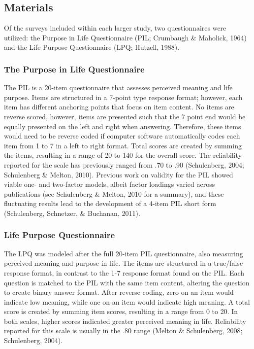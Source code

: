 \documentclass[english,man, mask]{apa6}
\theoremstyle{definition}
\theoremstyle{definition}
\theoremstyle{definition}
\theoremstyle{remark}
\begin{document}
\subsection{Materials}\label{materials}

Of the surveys included within each larger study, two questionnaires
were utilized: the Purpose in Life Questionnaire (PIL; Crumbaugh \&
Maholick, 1964) and the Life Purpose Questionnaire (LPQ; Hutzell, 1988).

\subsubsection{The Purpose in Life
Questionnaire}\label{the-purpose-in-life-questionnaire}

The PIL is a 20-item questionnaire that assesses perceived meaning and
life purpose. Items are structured in a 7-point type response format;
however, each item has different anchoring points that focus on item
content. No items are reverse scored, however, items are presented such
that the 7 point end would be equally presented on the left and right
when answering. Therefore, these items would need to be reverse coded if
computer software automatically codes each item from 1 to 7 in a left to
right format. Total scores are created by summing the items, resulting
in a range of 20 to 140 for the overall score. The reliability reported
for the scale has previously ranged from .70 to .90 (Schulenberg, 2004;
Schulenberg \& Melton, 2010). Previous work on validity for the PIL
showed viable one- and two-factor models, albeit factor loadings varied
across publications (see Schulenberg \& Melton, 2010 for a summary), and
these fluctuating results lead to the development of a 4-item PIL short
form (Schulenberg, Schnetzer, \& Buchanan, 2011).

\subsubsection{Life Purpose
Questionnaire}\label{life-purpose-questionnaire}

The LPQ was modeled after the full 20-item PIL questionnaire, also
measuring perceived meaning and purpose in life. The items are
structured in a true/false response format, in contrast to the 1-7
response format found on the PIL. Each question is matched to the PIL
with the same item content, altering the question to create binary
answer format. After reverse coding, zero on an item would indicate low
meaning, while one on an item would indicate high meaning. A total score
is created by summing item scores, resulting in a range from 0 to 20. In
both scales, higher scores indicated greater perceived meaning in life.
Reliability reported for this scale is usually in the .80 range (Melton
\& Schulenberg, 2008; Schulenberg, 2004).
\end{document}
